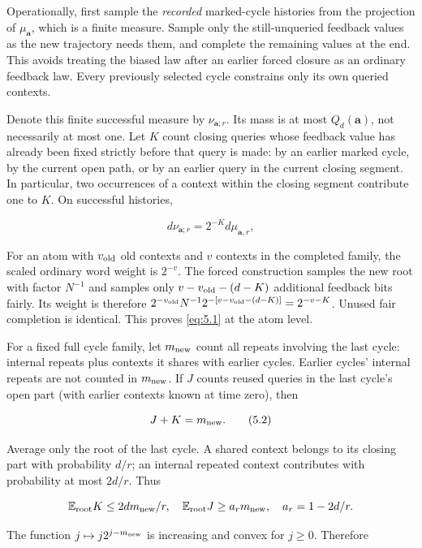 \documentclass[11pt]{article}
\theoremstyle{remark}
\begin{document}
Operationally, first sample the \emph{recorded} marked-cycle histories
from the projection of \(\mu_{\mathbf a}\), which is a finite measure.
Sample only the still-unqueried feedback values as the new trajectory
needs them, and complete the remaining values at the end. This avoids
treating the biased law after an earlier forced closure as an ordinary
feedback law. Every previously selected cycle constrains only its own
queried contexts.

Denote this finite successful measure by \(\nu_{\mathbf a;r}\). Its mass
is at most \(Q_d(\mathbf a)\), not necessarily at most one. Let \(K\)
count closing queries whose feedback value has already been fixed
strictly before that query is made: by an earlier marked cycle, by the
current open path, or by an earlier query in the current closing
segment. In particular, two occurrences of a context within the closing
segment contribute one to \(K\). On successful histories,

\[
 d\nu_{\mathbf a;r}=2^{-K}d\mu_{\mathbf a,r},
 \tag{5.1}\label{eq:5.1}
\]

For an atom with \(v_{\rm old}\) old contexts and \(v\) contexts in the
completed family, the scaled ordinary word weight is \(2^{-v}\). The
forced construction samples the new root with factor \(N^{-1}\) and
samples only \(v-v_{\rm old}-(d-K)\) additional feedback bits fairly.
Its weight is therefore \(2^{-v_{\rm old}}N^{-1}
2^{-[v-v_{\rm old}-(d-K)]}=2^{-v-K}\). Unused fair completion is
identical. This proves \eqref{eq:5.1} at the atom level.

For a fixed full cycle family, let \(m_{\rm new}\) count all repeats
involving the last cycle: internal repeats plus contexts it shares with
earlier cycles. Earlier cycles' internal repeats are not counted in
\(m_{\rm new}\). If \(J\) counts reused queries in the last cycle's open
part (with earlier contexts known at time zero), then

\[
 J+K=m_{\rm new}.
 \tag{5.2}\label{eq:5.2}
\]

Average only the root of the last cycle. A shared context belongs to its
closing part with probability \(d/r\); an internal repeated context
contributes with probability at most \(2d/r\). Thus

\[
 \mathbb E_{\rm root}K\le2dm_{\rm new}/r,
 \quad \mathbb E_{\rm root}J\ge a_rm_{\rm new},
 \quad a_r=1-2d/r.
\]

The function \(j\mapsto j2^{j-m_{\rm new}}\) is increasing and convex
for \(j\ge0\). Therefore
\end{document}
